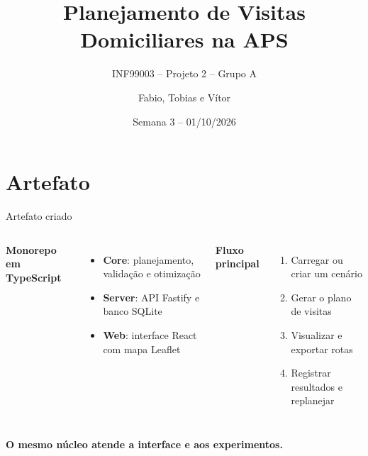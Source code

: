 \documentclass[aspectratio=169]{beamer}
\title[PHVD-APS -- Artefato e Experimentos]{Planejamento de Visitas Domiciliares na APS}
\subtitle{INF99003 -- Projeto 2 -- Grupo A}
\author{Fabio, Tobias e Vítor}
\date{Semana 3 -- 01/10/2026}
\begin{document}
\begin{frame}
  \titlepage %
\end{frame}

\section{Artefato}
\begin{frame}{Artefato criado}
  \begin{columns}[T]
      \textbf{Monorepo em TypeScript}
      \begin{itemize}
        \item \textbf{Core}: planejamento, validação e otimização
        \item \textbf{Server}: API Fastify e banco SQLite
        \item \textbf{Web}: interface React com mapa Leaflet
      \end{itemize}
      \textbf{Fluxo principal}
      \begin{enumerate}
        \item Carregar ou criar um cenário
        \item Gerar o plano de visitas
        \item Visualizar e exportar rotas
        \item Registrar resultados e replanejar
      \end{enumerate}
  \end{columns}
  \vspace{0.6em}
  \centering
  \textcolor{myblue}{\textbf{O mesmo núcleo atende a interface e aos experimentos.}}
\end{frame}
\end{document}
